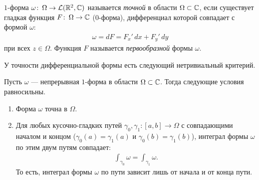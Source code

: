 \documentclass[../complex-analysis.tex]{subfiles}
\begin{document}
\begin{df}
 $1$-форма $\omega \colon\, \Omega \to \mathcal{L}(\mathbb{R}^2, \mathbb{C})$ называется \textit{точной} в области $\Omega \subset \mathbb{C}$, если существует гладкая функция $F \colon\, \Omega \to \mathbb{C}$ ($0$-форма), дифференциал которой совпадает с формой $ \omega $:
 \begin{align*}
  \omega = dF = F_x'\,dx + F_y'\,dy
 \end{align*} при всех $ z \in \Omega $. Функция $ F $ называется \textit{первообразной} формы $ \omega $.
\end{df}

У точности дифференциальной формы есть следующий нетривиальный критерий.

\begin{thm}
 \label{theorem:exact_1_form}
 Пусть $\omega$ --- непрерывная $1$-форма в области $\Omega \subset \mathbb{C}$. Тогда следующие условия равносильны.
 \begin{enumerate}
  \item \label{enum1:theorem:exact_1_form} Форма $\omega$ точна в $\Omega$.
  \item \label{enum2:theorem:exact_1_form} Для любых кусочно-гладких путей $\gamma_0, \gamma_1 \colon [a,b] \to \Omega$ с совпадающими началом и концом \textup{(}$\gamma_0(a)=\gamma_1(a)$ и $\gamma_0(b)=\gamma_1(b)$\textup{)}, интеграл формы $ \omega $ по этим двум путям совпадает:
   \begin{align}
    \label{eq:exact_1_form:integral_equals}
    \int_{\gamma_0}  \omega = \int_{\gamma_1} \omega.
   \end{align} То есть, интеграл формы $ \omega $ по пути зависит лишь от начала и от конца пути.
 \end{enumerate}
\end{thm}
\end{document}
